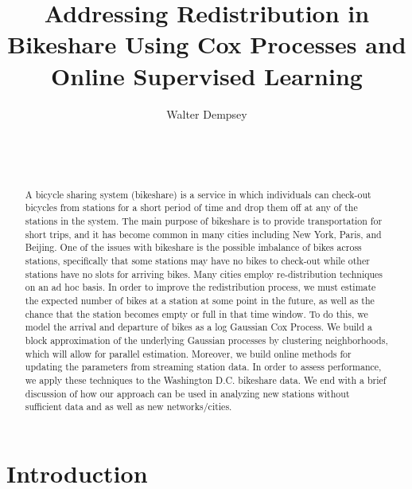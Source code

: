 \documentclass{acm_proc_article-sp}
\begin{document}
\title{Addressing Redistribution in Bikeshare Using Cox Processes and Online Supervised Learning}

\author{
\alignauthor
Walter Dempsey\\
       \\
       \\
       \\
}

\maketitle

\begin{abstract}
A bicycle sharing system (bikeshare) is a service in which individuals can check-out bicycles from stations for a short period of time and drop them off at any of the stations in the system. The main purpose of bikeshare is to provide transportation for short trips, and it has become common in many cities including New York, Paris, and Beijing. One of the issues with bikeshare is the possible imbalance of bikes across stations, specifically that some stations may have no bikes to check-out while other stations have no slots for arriving bikes. Many cities employ re-distribution techniques on an ad hoc basis. In order to improve the redistribution process, we must estimate the expected number of bikes at a station at some point in the future, as well as the chance that the station becomes empty or full in that time window. To do this, we model the arrival and departure of bikes as a log Gaussian Cox Process. We build a block approximation of the underlying Gaussian processes by clustering  neighborhoods, which will allow for parallel estimation. Moreover, we build online methods for updating the parameters from streaming station data. In order to assess performance, we apply these techniques to the Washington D.C. bikeshare data. We end with a brief discussion of how our approach can be used in analyzing new stations without sufficient data and as well as new networks/cities. 
\end{abstract}



\section{Introduction}
\end{document}
